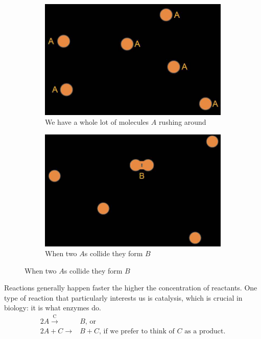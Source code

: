 \documentclass[]{article}
\begin{document}
\begin{figure}[H]
	\caption{Chemical Reaction: $2A \rightarrow B$}\label{fig:ChemicalReaction}
	\begin{subfigure}[m]{0.45\textwidth}
		\caption{We have a whole lot of molecules $A$ rushing around}
		\includegraphics[width=\textwidth]{ChemicalReaction1}
	\end{subfigure}
	\begin{subfigure}[m]{0.45\textwidth}
		\caption{When two $A$s  collide they form $B$}
		\includegraphics[width=\textwidth]{ChemicalReaction2}
	\end{subfigure}
\end{figure}

Reactions generally happen faster the higher the concentration of reactants. One type of reaction that particularly interests us is catalysis, which is crucial in biology: it is what enzymes do.
\begin{align*}
	2A \xrightarrow{\text{C}}& B \text{, or}\\
	2A + C \rightarrow& B +C \text{, if we prefer to think of $C$ as a product.}
\end{align*}
\end{document}
